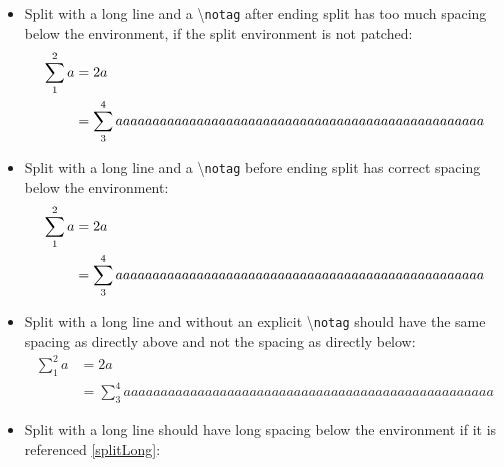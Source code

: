 \documentclass{article}
\begin{document}
\begin{itemize}
		\item Split with a long line and a \textbackslash\texttt{notag} after ending split has too much spacing below the environment, if the split environment is not patched:
			\begin{equation}
				\begin{split}
					\sum_1^2 a &= 2a\\
							&= \sum_3^4 aaaaaaaaaaaaaaaaaaaaaaaaaaaaaaaaaaaaaaaaaaaaaaaaaa
				\end{split}\notag
			\end{equation}
		\item Split with a long line and a \textbackslash\texttt{notag} before ending split has correct spacing below the environment:
			\begin{equation}
				\begin{split}
					\sum_1^2 a &= 2a\\
							&= \sum_3^4 aaaaaaaaaaaaaaaaaaaaaaaaaaaaaaaaaaaaaaaaaaaaaaaaaa\notag
				\end{split}
			\end{equation}
		\item Split with a long line and without an explicit \textbackslash\texttt{notag} should have the same spacing as directly above and not the spacing as directly below:
			\begin{equation}
				\begin{split}
					\sum_1^2 a &= 2a\\
							&= \sum_3^4 aaaaaaaaaaaaaaaaaaaaaaaaaaaaaaaaaaaaaaaaaaaaaaaaaa
				\end{split}
			\end{equation}
		\item Split with a long line should have long spacing below the environment if it is referenced \ref{splitLong}:

\end{itemize}
\end{document}
